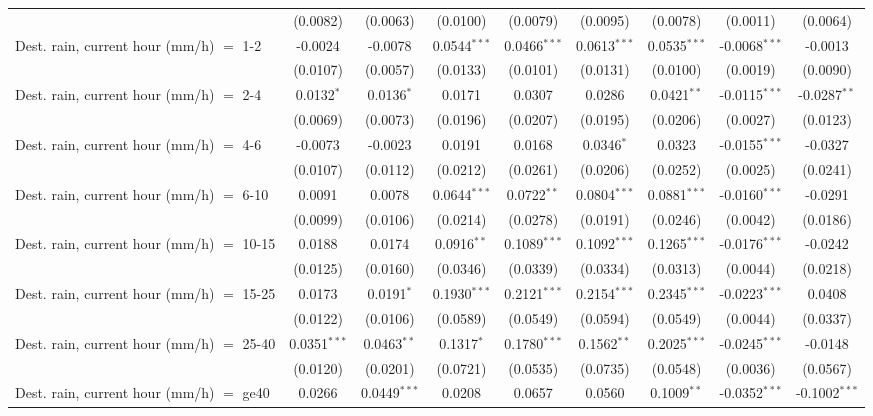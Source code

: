 \begin{tabular}{lcccccccc}
    & (0.0082) & (0.0063) & (0.0100) & (0.0079) & (0.0095) & (0.0078) & (0.0011) & (0.0064)\\
   Dest. rain, current hour (mm/h) $=$ 1-2 & -0.0024 & -0.0078 & 0.0544$^{***}$ & 0.0466$^{***}$ & 0.0613$^{***}$ & 0.0535$^{***}$ & -0.0068$^{***}$ & -0.0013\\
    & (0.0107) & (0.0057) & (0.0133) & (0.0101) & (0.0131) & (0.0100) & (0.0019) & (0.0090)\\
   Dest. rain, current hour (mm/h) $=$ 2-4 & 0.0132$^{*}$ & 0.0136$^{*}$ & 0.0171 & 0.0307 & 0.0286 & 0.0421$^{**}$ & -0.0115$^{***}$ & -0.0287$^{**}$\\
    & (0.0069) & (0.0073) & (0.0196) & (0.0207) & (0.0195) & (0.0206) & (0.0027) & (0.0123)\\
   Dest. rain, current hour (mm/h) $=$ 4-6 & -0.0073 & -0.0023 & 0.0191 & 0.0168 & 0.0346$^{*}$ & 0.0323 & -0.0155$^{***}$ & -0.0327\\
    & (0.0107) & (0.0112) & (0.0212) & (0.0261) & (0.0206) & (0.0252) & (0.0025) & (0.0241)\\
   Dest. rain, current hour (mm/h) $=$ 6-10 & 0.0091 & 0.0078 & 0.0644$^{***}$ & 0.0722$^{**}$ & 0.0804$^{***}$ & 0.0881$^{***}$ & -0.0160$^{***}$ & -0.0291\\
    & (0.0099) & (0.0106) & (0.0214) & (0.0278) & (0.0191) & (0.0246) & (0.0042) & (0.0186)\\
   Dest. rain, current hour (mm/h) $=$ 10-15 & 0.0188 & 0.0174 & 0.0916$^{**}$ & 0.1089$^{***}$ & 0.1092$^{***}$ & 0.1265$^{***}$ & -0.0176$^{***}$ & -0.0242\\
    & (0.0125) & (0.0160) & (0.0346) & (0.0339) & (0.0334) & (0.0313) & (0.0044) & (0.0218)\\
   Dest. rain, current hour (mm/h) $=$ 15-25 & 0.0173 & 0.0191$^{*}$ & 0.1930$^{***}$ & 0.2121$^{***}$ & 0.2154$^{***}$ & 0.2345$^{***}$ & -0.0223$^{***}$ & 0.0408\\
    & (0.0122) & (0.0106) & (0.0589) & (0.0549) & (0.0594) & (0.0549) & (0.0044) & (0.0337)\\
   Dest. rain, current hour (mm/h) $=$ 25-40 & 0.0351$^{***}$ & 0.0463$^{**}$ & 0.1317$^{*}$ & 0.1780$^{***}$ & 0.1562$^{**}$ & 0.2025$^{***}$ & -0.0245$^{***}$ & -0.0148\\
    & (0.0120) & (0.0201) & (0.0721) & (0.0535) & (0.0735) & (0.0548) & (0.0036) & (0.0567)\\
   Dest. rain, current hour (mm/h) $=$ ge40 & 0.0266 & 0.0449$^{***}$ & 0.0208 & 0.0657 & 0.0560 & 0.1009$^{**}$ & -0.0352$^{***}$ & -0.1002$^{***}$\\

\end{tabular}
